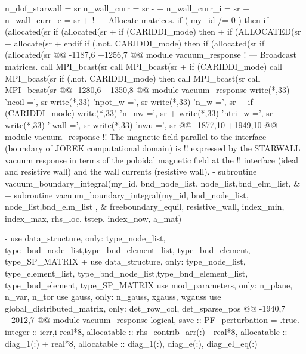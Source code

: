      n_dof_starwall = sr%
     n_wall_curr    = sr%
-    
+    n_wall_curr_i  = sr%
+    n_wall_curr_e  = sr%
+
     ! --- Allocate matrices.
     if ( my_id /= 0 ) then
       if (allocated(sr%
       if (allocated(sr%
+      if (CARIDDI_mode) then
+        if (ALLOCATED(sr%
+        allocate(sr%
+      endif
       if (.not. CARIDDI_mode) then
         if (allocated(sr%
         if (allocated(sr%
@@ -1187,6 +1256,7 @@ module vacuum_response
     ! --- Broadcast matrices.
     call MPI_bcast(sr%
     call MPI_bcast(sr%
+    if (CARIDDI_mode) call MPI_bcast(sr%
     if (.not. CARIDDI_mode) then
       call MPI_bcast(sr%
       call MPI_bcast(sr%
@@ -1280,6 +1350,8 @@ module vacuum_response
        write(*,33) 'ncoil                   =', sr%
        write(*,33) 'npot_w                  =', sr%
        write(*,33) 'n_w                     =', sr%
+       if (CARIDDI_mode)        write(*,33) 'n_nw                     =', sr%
+
        write(*,33) 'ntri_w                  =', sr%
        write(*,33) 'iwall                   =', sr%
        write(*,33) 'nwu                     =', sr%
@@ -1877,10 +1949,10 @@ module vacuum_response
   !! The magnetic field parallel to the interface (boundary of JOREK computational domain) is
   !! expressed by the STARWALL vacuum response in terms of the poloidal magnetic field at the
   !! interface (ideal and resistive wall) and the wall currents (resistive wall).
-  subroutine vacuum_boundary_integral(my_id, bnd_node_list, node_list,bnd_elm_list,               &
+  subroutine vacuum_boundary_integral(my_id, bnd_node_list, node_list,bnd_elm_list ,              &
     freeboundary_equil, resistive_wall, index_min, index_max, rhs_loc, tstep, index_now, a_mat)
 
-    use data_structure, only: type_node_list, type_bnd_node_list,type_bnd_element_list, type_bnd_element, type_SP_MATRIX
+    use data_structure, only: type_node_list, type_element_list, type_bnd_node_list,type_bnd_element_list, type_bnd_element, type_SP_MATRIX
     use mod_parameters, only: n_plane, n_var, n_tor
     use gauss,          only: n_gauss, xgauss, wgauss
     use global_distributed_matrix, only: det_row_col, det_sparse_pos
@@ -1940,7 +2012,7 @@ module vacuum_response
     logical, save  :: PF_perturbation = .true.
     integer  :: ierr,i
     real*8, allocatable :: rhs_contrib_arr(:)
-    real*8, allocatable :: diag_1(:)
+    real*8, allocatable :: diag_1(:), diag_e(:), diag_el_eq(:)
 

